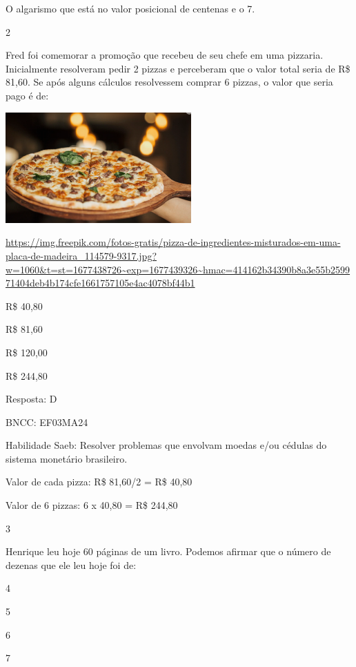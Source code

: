 \begin{escolha}
{\begin{escolha}
{O algarismo que está no valor posicional de centenas e o 7.

\num{2}

Fred foi comemorar a promoção que recebeu de seu chefe em uma pizzaria.
Inicialmente resolveram pedir 2 pizzas e perceberam que o valor total
seria de R\$ 81,60. Se após alguns cálculos resolvessem comprar 6
pizzas, o valor que seria pago é de:

\includegraphics[width=2.80000in,height=1.66867in]{media/image131.png}

\url{https://img.freepik.com/fotos-gratis/pizza-de-ingredientes-misturados-em-uma-placa-de-madeira_114579-9317.jpg?w=1060\&t=st=1677438726~exp=1677439326~hmac=414162b34390b8a3e55b259971404deb4b174cfe1661757105e4ac4078bf44b1}

\begin{escolha}

\item
  R\$ 40,80
\item
  R\$ 81,60
\item
  R\$ 120,00
\item
  R\$ 244,80
\end{escolha}

Resposta: D

BNCC: EF03MA24

Habilidade Saeb: Resolver problemas que envolvam moedas e/ou cédulas do
sistema monetário brasileiro.

Valor de cada pizza: R\$ 81,60/2 = R\$ 40,80

Valor de 6 pizzas: 6 x 40,80 = R\$ 244,80

\num{3}

Henrique leu hoje 60 páginas de um livro. Podemos afirmar que o número
de dezenas que ele leu hoje foi de:

\begin{escolha}

\item
  4
\item
  5
\item
  6
\item
  7
\end{escolha}

}
\end{escolha}}
\end{escolha}
